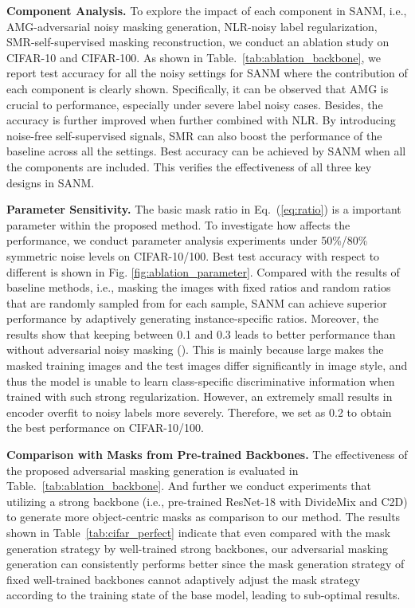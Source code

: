 \documentclass[10pt,twocolumn,letterpaper]{article}
\begin{document}
\textbf{Component Analysis.} To explore the impact of each component in SANM, i.e., AMG-adversarial noisy masking generation, NLR-noisy label regularization, SMR-self-supervised masking reconstruction, we conduct an ablation study on CIFAR-10 and CIFAR-100. As shown in Table.~\ref{tab:ablation_backbone}, we report test accuracy for all the noisy settings for SANM where the contribution of each component is clearly shown. Specifically, it can be observed that AMG is crucial to performance, especially under severe label noisy cases. Besides, the accuracy is {further} improved when further combined with NLR. By introducing noise-free self-supervised signals, SMR can also boost the performance of the baseline across all the settings. Best accuracy can be achieved by SANM when all the components are included. {This verifies the effectiveness of all three key designs in SANM.}

\textbf{Parameter Sensitivity.} {The basic mask ratio  in Eq.~(\ref{eq:ratio}) is a important parameter within the proposed method. To investigate how  affects the performance,} we conduct parameter analysis experiments under 50\%/80\% symmetric noise levels on CIFAR-10/100. Best test accuracy with respect to different  is shown in Fig. \ref{fig:ablation_parameter}. Compared with the results of {baseline methods, i.e.,} masking the images with fixed ratios and random ratios that are randomly sampled from  for each sample, SANM can achieve superior performance by adaptively generating instance-specific ratios. Moreover, the results show that keeping  between 0.1 and 0.3 leads to better performance than without adversarial noisy masking (). This is mainly because large  makes the masked training images and the test images differ significantly in image style, and thus the model is unable to learn class-specific discriminative information when trained with such strong regularization. However, an extremely small  {results in}
encoder overfit to noisy labels more severely. {Therefore}, we set  as 0.2 to obtain the best performance on CIFAR-10/100. 

\textbf{Comparison with Masks from Pre-trained Backbones.} The effectiveness of the proposed adversarial masking generation is evaluated in Table.~\ref{tab:ablation_backbone}. And further we conduct experiments that utilizing a strong backbone (i.e., pre-trained ResNet-18 with DivideMix and C2D) to generate more object-centric masks as comparison to our method. The results shown in Table~\ref{tab:cifar_perfect} indicate that even compared with the mask generation strategy by well-trained strong backbones, our adversarial masking generation can consistently performs better since the mask generation strategy of fixed well-trained backbones cannot adaptively adjust the mask strategy according to the training state of the base model, leading to sub-optimal results.
\end{document}
